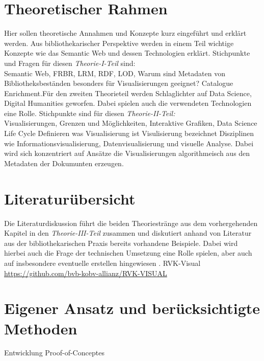 \documentclass[10pt,a4paper,twocolumn,conference]{IEEEtran}
\begin{document}
\section{Theoretischer Rahmen}
Hier sollen theoretische Annahmen und Konzepte kurz eingeführt und erklärt
werden. Aus bibliothekarischer Perspektive werden in einem Teil wichtige
Konzepte wie das Semantic Web und dessen Technologien erklärt.\cite{RN8}  Stichpunkte und
Fragen für diesen \textit{Theorie-I-Teil} sind:\\
Semantic Web, FRBR, LRM, RDF, LOD, Warum sind Metadaten von
Bibliotheksbeständen besonders für Visualisierungen geeignet? Catalogue
Enrichment.Für den zweiten Theorieteil werden Schlaglichter auf Data
Science, Digital Humanities geworfen. Dabei spielen auch die verwendeten
Technologien eine Rolle. Stichpunkte sind für diesen \textit{Theorie-II-Teil:}\\
Visualisierungen, Grenzen und Möglichkeiten, Interaktive Grafiken,
Data Science Life Cycle
Definieren was Visualisierung ist
Visulisierung bezeichnet Disziplinen wie Informationsvisualisierung,
Datenvisualisierung und visuelle Analyse. Dabei wird sich konzentriert auf 
Ansätze die Visualisierungen algorithmeisch aus den Metadaten der Dokumunten
erzeugen.
\section{Literaturübersicht}
Die Literaturdiskussion führt die beiden Theoriestränge aus dem vorhergehenden
Kapitel in den \textit{Theorie-III-Teil} zusammen und diskutiert anhand 
von Literatur aus der bibliothekarischen Praxis bereits vorhandene Beispiele. 
Dabei wird hierbei auch die Frage der technischen Umsetzung eine Rolle spielen,
aber auch auf insbesondere eventuelle erstellen hingewiesen \cite{RN9, RN3}.
RVK-Visual \url{https://github.com/bvb-kobv-allianz/RVK-VISUAL}
\section{Eigener Ansatz und berücksichtigte Methoden}
Entwicklung Proof-of-Conceptes
\end{document}
